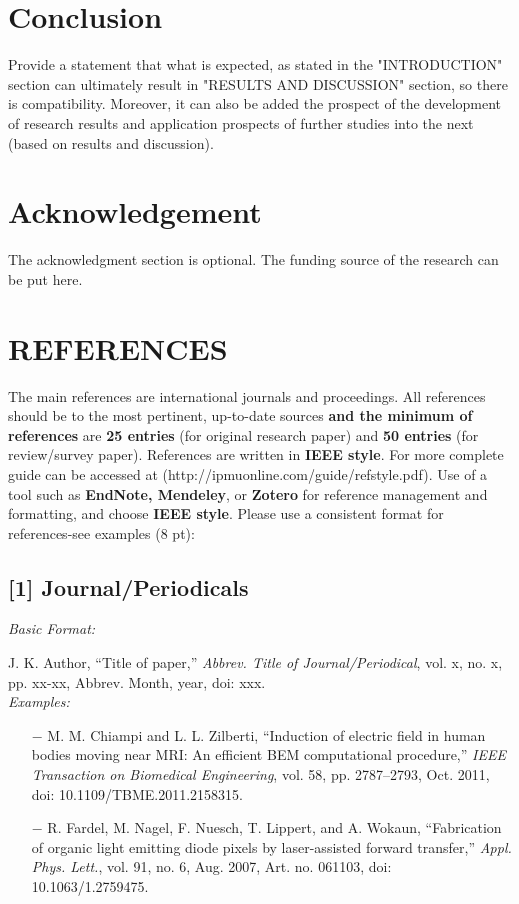 \documentclass{telkomnika}
\begin{document}
\section{Conclusion}
\label{}
Provide a statement that what is expected, as stated in the "INTRODUCTION" section can ultimately result in "RESULTS AND DISCUSSION" section, so there is compatibility. Moreover, it can also be added the prospect of the development of research results and application prospects of further studies into the next (based on results and discussion).

\section*{Acknowledgement}
\label{}
The acknowledgment section is optional. The funding source of the research can be put here.

\section*{REFERENCES}
\label{}
\footnotesize
The main references are international journals and proceedings. All references should be to the most pertinent, up-to-date sources \textbf{and the minimum of references} are \textbf{25 entries} (for original research paper) and \textbf{50 entries} (for review/survey paper). References are written in \textbf{IEEE style}. For more complete guide can be accessed at (http://ipmuonline.com/guide/refstyle.pdf). Use of a tool such as \textbf{EndNote, Mendeley}, or \textbf{Zotero} for reference management and formatting, and choose \textbf{IEEE style}. Please use a consistent format for references-see examples (8 pt):

\subsection*{[1] Journal/Periodicals}
\footnotesize
\begin{flushleft}
\textsl{Basic Format:\\}
\end{flushleft}
\vspace{-1.1em} 
J. K. Author, “Title of paper,” \textsl{Abbrev. Title of Journal/Periodical}, vol. x, no. x, pp. xx-xx, Abbrev. Month, year, doi: xxx.\\ 
\emph{Examples:}
\begin{enumerate} [leftmargin=*, topsep=0.3ex, itemsep=0.3ex, parsep=0.2ex]
\footnotesize
\item[$-$] M. M. Chiampi and L. L. Zilberti, “Induction of electric field in human bodies moving near MRI: An efficient BEM computational procedure,” \textsl{IEEE Transaction on Biomedical Engineering}, vol. 58, pp. 2787–2793, Oct. 2011, doi: 10.1109/TBME.2011.2158315.
\item[$-$] R. Fardel, M. Nagel, F. Nuesch, T. Lippert, and A. Wokaun, “Fabrication of organic light emitting diode pixels by laser-assisted forward transfer,” \textsl{Appl. Phys. Lett.}, vol. 91, no. 6, Aug. 2007, Art. no. 061103, doi: 10.1063/1.2759475.
\end{enumerate}
\end{document}
